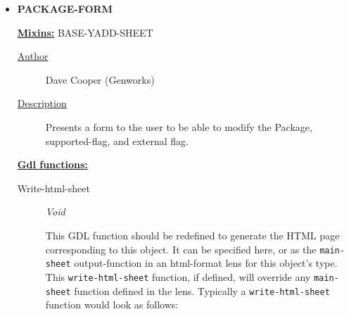 \documentclass [11pt]{book}
\begin{document}
\begin{itemize}







\item {}
\textbf{PACKAGE-FORM}


\textbf{
\underline{Mixins:}} BASE-YADD-SHEET





\begin{description}

\item [
\underline{Author}]


Dave Cooper (Genworks)



\item [
\underline{Description}]


Presents a form to the user to be able to modify the Package, 
supported-flag, and external flag.



\end{description}








\textbf{
\underline{Gdl functions:}}

\begin{description}

\item [Write-html-sheet]
\emph{Void}

 This GDL function should be redefined to generate the HTML page corresponding to this object.
It can be specified here, or as the \texttt{main-sheet} output-function in an html-format lens for this
object's type. This \texttt{write-html-sheet} function, if defined,  will override any \texttt{main-sheet}
function defined in the lens. Typically a \texttt{write-html-sheet} function would look as follows:




\end{description}







\end{itemize}
\end{document}
